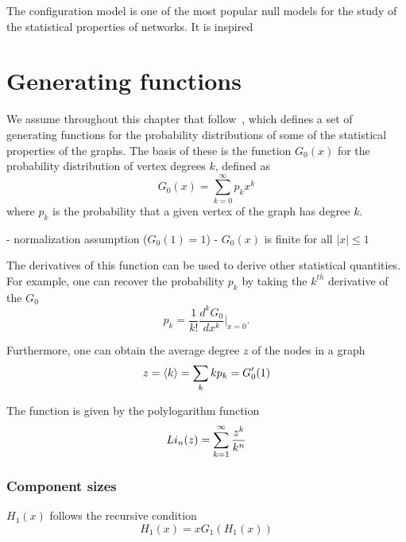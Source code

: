 The configuration model is one of the most popular null models for the study of the statistical properties of networks.
It is inspired 


\section{Generating functions} %
\label{sec:generating_functions}



We assume throughout this chapter that  follow~\cite{Newman:zFi032Kd}, which defines a set of generating functions for the probability distributions of some of the statistical properties of the graphs.
The basis of these is the function $G_0(x)$ for the probability distribution of vertex degrees $k$, defined as
\begin{equation}
G_0(x) = \sum_{k=0}^{\infty} p_k x^k
\end{equation}
where $p_k$ is the probability that a given vertex of the graph has degree $k$.

- normalization assumption ($G_0(1) = 1$)
- $G_0(x)$ is finite for all $|x| \le 1$

The derivatives of this function can be used to derive other statistical quantities.
For example, one can recover the probability $p_k$ by taking the $k^{th}$ derivative of the $G_0$
\begin{equation}
	p_k = \frac{1}{k!} \frac{d^k G_0}{dx^k} \Big|_{x=0}.
\end{equation}

Furthermore, one can obtain the average degree $z$ of the nodes in a graph 
\begin{equation}
	z = \left< k \right> = \sum_k k p_k = G'_0(1)
\end{equation}

The function is given by the polylogarithm function
\begin{equation}
	Li_{n} ({z}) = \sum_{k=1}^{\infty} \frac{z^k}{k^n}
\end{equation}

\subsubsection{Component sizes} %
\label{ssub:component_sizes}

$H_1(x)$ follows the recursive condition
\begin{equation}
	H_1(x) = x G_1( H_1(x))
\end{equation}


